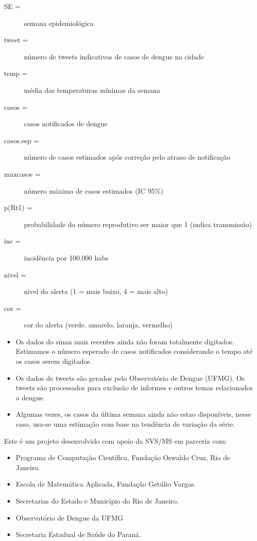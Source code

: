 \documentclass[10pt]{article} %
\begin{document}
\begin{minipage}[t]{1\linewidth} 

\hypertarget{vartab}{}

\begin{description}
\item[SE =] semana epidemiológica
\item [tweet =] número de tweets indicativos de casos de dengue na cidade
\item [temp =] média das temperaturas mínimas da semana
\item [casos =] casos notificados de dengue 
\item [casos.esp =] número de casos estimados após correção pelo atraso de notificação
\item [maxcasos =] número máximo de casos estimados (IC 95\%)
\item [p(Rt1) =] probabilidade do número reprodutivo ser maior que 1 (indica transmissão)
\item [inc =] incidência por 100.000 habs
\item [nivel =] nivel do alerta (1 = mais baixo, 4 = mais alto)
\item [cor =] cor do alerta (verde, amarelo, laranja, vermelho)
\end{description}

\hypertarget{notas}{}

\begin{itemize}
\item Os dados do sinan mais recentes ainda não foram totalmente digitados. Estimamos o número esperado de casos notificados considerando o tempo até os casos serem digitados.
\item Os dados de tweets são gerados pelo Observatório de Dengue (UFMG). Os tweets são processados para exclusão de informes e outros temas relacionados a dengue.
\item Algumas vezes, os casos da última semana ainda não estao disponíveis, nesse caso, usa-se uma estimação com base na tendência de variação da série.
\end{itemize}

\hypertarget{creditos}{}

Este é um projeto desenvolvido com apoio da SVS/MS em parceria com:

\begin{itemize}
\item Programa de Computação Científica, Fundação Oswaldo Cruz, Rio de Janeiro.
\item Escola de Matemática Aplicada, Fundação Getúlio Vargas.
\item Secretarias do Estado e Município do Rio de Janeiro.
\item Observatório de Dengue da UFMG
\item Secretaria Estadual de Saúde do Paraná.
\end{itemize}


\end{minipage}
\end{document}
